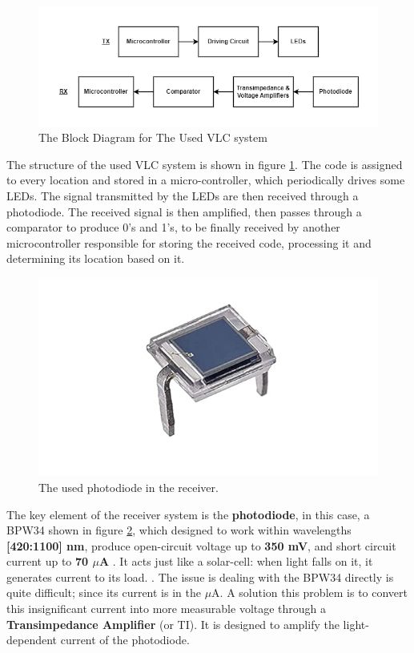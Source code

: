 \begin{figure}[h!]
	\centering
	\includegraphics[scale=0.5]{Figures/HW/VLC-blk.png}
	\caption{The Block Diagram for The Used VLC system}
	\label{fig:hw-vlc-blk}
\end{figure}

The structure of the used VLC system is shown in figure \ref{fig:hw-vlc-blk}. The code is assigned to every location and stored in a micro-controller, which periodically drives some LEDs. The signal transmitted by the LEDs are then received through a photodiode. The received signal is then amplified, then passes through a comparator to produce 0's and 1's, to be finally received by another microcontroller responsible for storing the received code, processing it and determining its location based on it.

\begin{figure}[h!]
	\centering
	\includegraphics[scale=0.4]{Figures/HW/BPW34.png}
	\caption{The used photodiode in the receiver.}
	\label{fig:hw-vlc-pd}
\end{figure}


The key element of the receiver system is the \textbf{photodiode}, in this case, a BPW34 shown in figure \ref{fig:hw-vlc-pd}, which designed to work within wavelengths \textbf{[420:1100] nm}, produce open-circuit voltage up to \textbf{350 mV}, and short circuit current up to \textbf{70 $\mu$A }. It acts just like a solar-cell: when light falls on it, it generates current to its load. \cite{BPW34-datasheet}.
\newline The issue is dealing with the BPW34 directly is quite difficult; since its current is in the $\mu$A. A solution this problem is to convert this insignificant current into more measurable voltage through a \textbf{Transimpedance Amplifier} (or TI). It is designed to amplify the light-dependent current of the photodiode. 

